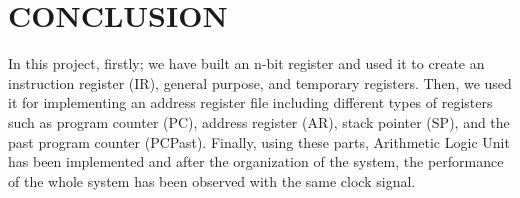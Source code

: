 \documentclass[pdftex,12pt,a4paper]{article}
\begin{document}
\section{CONCLUSION}
In this project, firstly; we have built an n-bit register and used it to create an instruction register (IR), general purpose, and temporary registers. Then, we used it for implementing an address register file including different types of registers such as program counter (PC), address register (AR), stack pointer (SP), and the past program counter (PCPast). Finally, using these parts, Arithmetic Logic Unit has been implemented and after the organization of the system, the performance of the whole system has been observed with the same clock signal.

\newpage
{}



\end{document}
